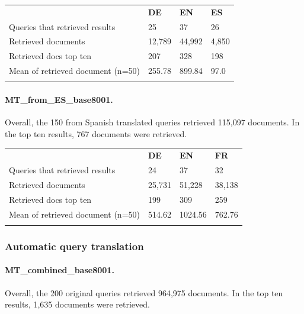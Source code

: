 \documentclass[a4paper,11pt]{article}
\begin{document}
\begin{table}[h]
\centering
\begin{tabularx}{0.81\textwidth}{llll}
\cmidrule{1-4}
\addlinespace
& \textbf{DE} & \textbf{EN} & \textbf{ES} \\
\addlinespace
\cmidrule{1-4}
\addlinespace
Queries that retrieved results & 25 & 37 & 26 \\
Retrieved documents & 12,789 & 44,992 & 4,850 \\
Retrieved docs top ten & 207 & 328 & 198 \\
Mean of retrieved document (n=50) & 255.78 & 899.84 & 97.0 \\
\addlinespace
\cmidrule{1-4}
\end{tabularx}
\label{result_list_analysis_mt_fr}
\end{table}

\paragraph{MT\_from\_ES\_base8001.}
Overall, the 150 from Spanish translated queries retrieved 115,097 documents. In the top ten results, 767 documents were retrieved.

\begin{table}[h]
\centering
\begin{tabularx}{0.81\textwidth}{llll}
\cmidrule{1-4}
\addlinespace
& \textbf{DE} & \textbf{EN} & \textbf{FR} \\
\addlinespace
\cmidrule{1-4}
\addlinespace
Queries that retrieved results & 24 & 37 & 32 \\
Retrieved documents & 25,731 & 51,228 & 38,138 \\
Retrieved docs top ten & 199 & 309 & 259 \\
Mean of retrieved document (n=50) & 514.62 & 1024.56 & 762.76 \\
\addlinespace
\cmidrule{1-4}
\end{tabularx}
\label{result_list_analysis_mt_es}
\end{table}

\subsubsection{Automatic query translation}
\paragraph{MT\_combined\_base8001.}
Overall, the 200 original queries retrieved 964,975 documents. In the top ten results, 1,635 documents were retrieved.
\end{document}
